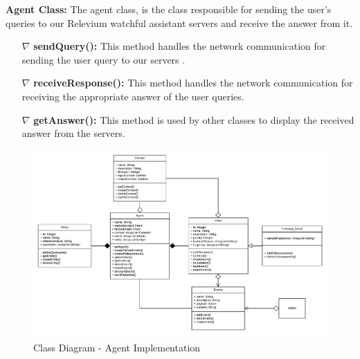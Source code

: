 \documentclass{scrreprt}
\begin{document}
\textbf{Agent Class:} The agent class, is the class responsible for sending the user's queries to our Relevium watchful assistant servers and receive the answer from it.
\begin{itemize}

	\item[$\nabla$] \textbf{sendQuery():} This method handles the network communication for sending the user query to our servers .
	\item[$\nabla$] \textbf{receiveResponse():} This method handles the network communication for receiving the appropriate answer of the user queries. 
	\item[$\nabla$] \textbf{getAnswer():} This method is used by other classes to display the received answer from the servers.
\end{itemize}



\clearpage
\begin{figure}[ht!]
    \centering
    \includegraphics[angle=90, height=\textheight]{img2/ClassDiagramAgent.pdf}
    \caption{Class Diagram - Agent Implementation}
    \label{fig:classdiagramagent}
\end{figure}
\end{document}
